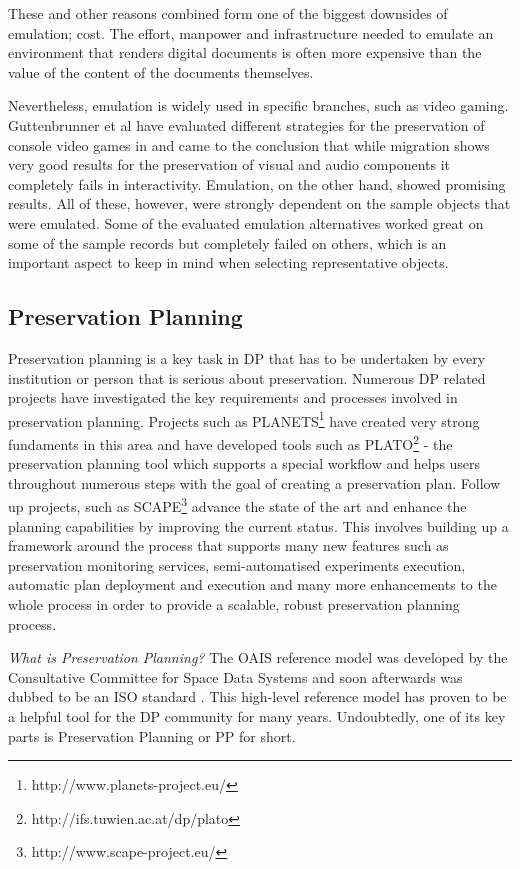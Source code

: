 These and other reasons combined form one of the biggest downsides of emulation; cost. The effort, manpower and infrastructure needed to emulate an environment that renders digital documents is often more expensive than the value of the content of the documents themselves.

Nevertheless, emulation is widely used in specific branches, such as video gaming.
Guttenbrunner et al have evaluated different strategies for the preservation of console video games in \cite{guttenbrunner:2008:evaluating} and came to the conclusion that while migration shows very good results for the preservation of visual and audio components it completely fails in interactivity. Emulation, on the other hand, showed promising results. All of these, however, were strongly dependent on the sample objects that were emulated. Some of the evaluated emulation alternatives worked great on some of the sample records but completely failed on others, which is an important aspect to keep in mind when selecting representative objects.

\subsection{Preservation Planning}
Preservation planning is a key task in DP that has to be undertaken by every institution or person that is serious about preservation. Numerous DP related projects have investigated the key requirements and processes involved in preservation planning. Projects such as PLANETS\footnote{http://www.planets-project.eu/} have created very strong fundaments in this area and have developed tools such as PLATO\footnote{http://ifs.tuwien.ac.at/dp/plato} - the preservation planning tool which supports a special workflow and helps users throughout numerous steps with the goal of creating a preservation plan. Follow up projects, such as SCAPE\footnote{http://www.scape-project.eu/} advance the state of the art and enhance the planning capabilities by improving the current status. This involves building up a framework around the process that supports many new features such as preservation monitoring services, semi-automatised experiments execution, automatic plan deployment and execution and many more enhancements to the whole process in order to provide a scalable, robust preservation planning process.\newline

\noindent\textit{What is Preservation Planning?}\newline
The OAIS reference model was developed by the Consultative Committee for Space Data Systems and soon afterwards was dubbed to be an ISO standard \cite{iso:2003:oais}. This high-level reference model has proven to be a helpful tool for the DP community for many years. Undoubtedly, one of its key parts is Preservation Planning or PP for short.

